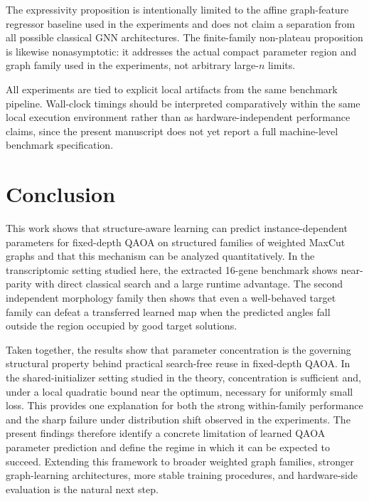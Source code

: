 \documentclass[
  reprint,
  twocolumn,
  aps,
  superscriptaddress,
  longbibliography,
  floatfix
]{revtex4-2}
\begin{document}
The expressivity proposition is intentionally limited to the affine graph-feature regressor baseline used in the experiments and does not claim a separation from all possible classical GNN architectures. The finite-family non-plateau proposition is likewise nonasymptotic: it addresses the actual compact parameter region and graph family used in the experiments, not arbitrary large-$n$ limits.

All experiments are tied to explicit local artifacts from the same benchmark pipeline. Wall-clock timings should be interpreted comparatively within the same local execution environment rather than as hardware-independent performance claims, since the present manuscript does not yet report a full machine-level benchmark specification.

\section{Conclusion}
This work shows that structure-aware learning can predict instance-dependent parameters for fixed-depth QAOA on structured families of weighted MaxCut graphs and that this mechanism can be analyzed quantitatively. In the transcriptomic setting studied here, the extracted 16-gene benchmark shows near-parity with direct classical search and a large runtime advantage. The second independent morphology family then shows that even a well-behaved target family can defeat a transferred learned map when the predicted angles fall outside the region occupied by good target solutions.

Taken together, the results show that parameter concentration is the governing structural property behind practical search-free reuse in fixed-depth QAOA. In the shared-initializer setting studied in the theory, concentration is sufficient and, under a local quadratic bound near the optimum, necessary for uniformly small loss. This provides one explanation for both the strong within-family performance and the sharp failure under distribution shift observed in the experiments. The present findings therefore identify a concrete limitation of learned QAOA parameter prediction and define the regime in which it can be expected to succeed. Extending this framework to broader weighted graph families, stronger graph-learning architectures, more stable training procedures, and hardware-side evaluation is the natural next step.




\clearpage
\appendix
\end{document}
